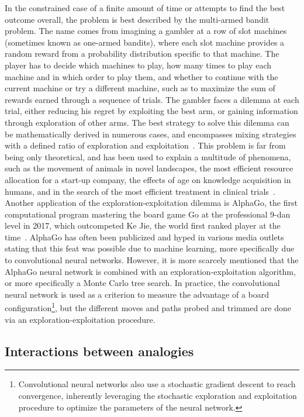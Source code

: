 In the constrained case of a finite amount of time or attempts to find the best outcome overall, the problem is best described by the multi-armed bandit problem.
The name comes from imagining a gambler at a row of slot machines (sometimes known as one-armed bandits), where each slot machine provides a random reward from a probability distribution specific to that machine. The player has to decide which machines to play, how many times to play each machine and in which order to play them, and whether to continue with the current machine or try a different machine, such as to maximize the sum of rewards earned through a sequence of trials.
The gambler faces a dilemma at each trial, either reducing his regret by exploiting the best arm, or gaining information through exploration of other arms.
The best strategy to solve this dilemma can be mathematically derived in numerous cases, and encompasses mixing strategies with a defined ratio of exploration and exploitation~\citep{Auer2002,Kocsis2006,Furnkranz2006}.
This problem is far from being only theoretical, and has been used to explain a multitude of phenomena, such as the movement of animals in novel landscapes, the most efficient resource allocation for a start-up company, the effects of age on knowledge acquisition in humans, and in the search of the most efficient treatment in clinical trials~\citep{Berger-Tal2014, March}.
Another application of the exploration-exploitation dilemma is AlphaGo, the first computational program mastering the board game Go at the professional 9-dan level in 2017, which outcompeted Ke Jie, the world first ranked player at the time~\citep{Silver2017, Silver2018}.
AlphaGo has often been publicized and hyped in various media outlets stating that this feat was possible due to machine learning, more specifically due to convolutional neural networks.
However, it is more scarcely mentioned that the AlphaGo neural network is combined with an exploration-exploitation algorithm, or more specifically a Monte Carlo tree search.
In practice, the convolutional neural network is used as a criterion to measure the advantage of a board configuration\footnote{Convolutional neural networks also use a stochastic gradient descent to reach convergence, inherently leveraging the stochastic exploration and exploitation procedure to optimize the parameters of the neural network.}, but the different moves and paths probed and trimmed are done via an exploration-exploitation procedure.

\subsection{Interactions between analogies}

